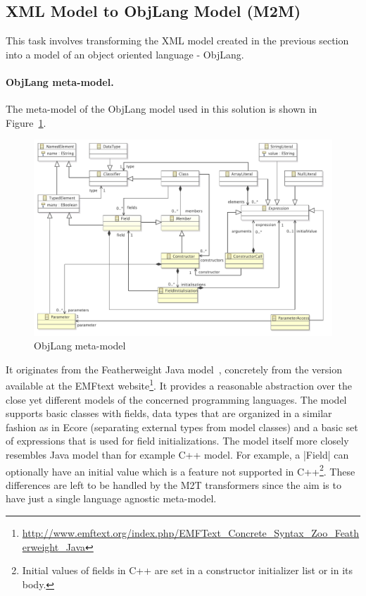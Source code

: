 \subsection{XML Model to ObjLang Model (M2M)}

This task involves transforming the XML model created in the previous section into a model of an object oriented language - ObjLang.

\paragraph{ObjLang meta-model.}
%
The meta-model of the ObjLang model used in this solution is shown in Figure~\ref{fig:ObjLangMetaModel}.
%
\begin{figure}[h!bt]
  \centering
  \includegraphics[width=\textwidth]{figures/ObjLangMetaModel.pdf}
  \caption{ObjLang meta-model}
  \label{fig:ObjLangMetaModel}
\end{figure}
%
It originates from the Featherweight Java model~\cite{Igarashi2001}, concretely from the version available at the EMFtext website\footnote{\url{http://www.emftext.org/index.php/EMFText_Concrete_Syntax_Zoo_Featherweight_Java}}.
It provides a reasonable abstraction over the close yet different models of the concerned programming languages.
The model supports basic classes with fields, data types that are organized in a similar fashion as in Ecore (\Ie separating external types from model classes) and a basic set of expressions that is used for field initializations.
The model itself more closely resembles Java model than for example C++ model.
For example, a \Scala|Field| can optionally have an initial value which is a feature not supported in C++\footnote{Initial values of fields in C++ are set in a constructor initializer list or in its body.}.
These differences are left to be handled by the M2T transformers since the aim is to have just a single language agnostic meta-model.

